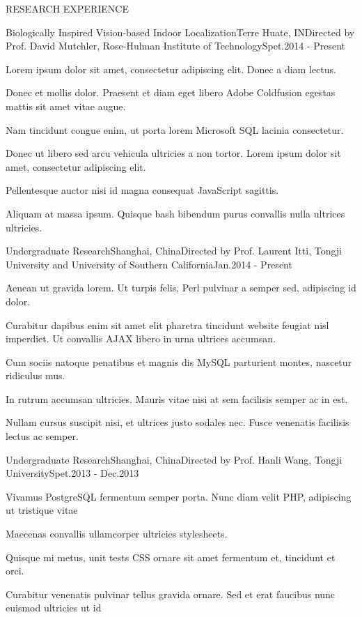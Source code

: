 \documentclass{resume} %
\begin{document}
\begin{rSection}{RESEARCH EXPERIENCE}

  \begin{rSubsection}{Biologically Inspired Vision-based Indoor Localization}{Terre Huate, IN}{Directed by Prof. David
    Mutchler, Rose-Hulman Institute of Technology}{Spet.2014 - Present}
  \item Lorem ipsum dolor sit amet, consectetur adipiscing elit. Donec a diam lectus.
  \item Donec et mollis dolor. Praesent et diam eget libero Adobe Coldfusion egestas mattis sit amet vitae augue.
  \item Nam tincidunt congue enim, ut porta lorem Microsoft SQL lacinia consectetur.
  \item Donec ut libero sed arcu vehicula ultricies a non tortor. Lorem ipsum dolor sit amet, consectetur adipiscing elit.
  \item Pellentesque auctor nisi id magna consequat JavaScript sagittis.
  \item Aliquam at massa ipsum. Quisque bash bibendum purus convallis nulla ultrices ultricies.
  \end{rSubsection}


  \begin{rSubsection}{Undergraduate Research}{Shanghai, China}{Directed by Prof. Laurent Itti, Tongji
    University and University of Southern California}{Jan.2014 - Present}
  \item Aenean ut gravida lorem. Ut turpis felis, Perl pulvinar a semper sed, adipiscing id dolor.
  \item Curabitur dapibus enim sit amet elit pharetra tincidunt website feugiat nisl imperdiet. Ut convallis AJAX libero in urna ultrices accumsan.
  \item Cum sociis natoque penatibus et magnis dis MySQL parturient montes, nascetur ridiculus mus.
  \item In rutrum accumsan ultricies. Mauris vitae nisi at sem facilisis semper ac in est.
  \item Nullam cursus suscipit nisi, et ultrices justo sodales nec. Fusce venenatis facilisis lectus ac semper.
  \end{rSubsection}


  \begin{rSubsection}{Undergraduate Research}{Shanghai, China}{Directed by Prof. Hanli Wang, Tongji
    University}{Spet.2013 - Dec.2013}
  \item Vivamus PostgreSQL fermentum semper porta. Nunc diam velit PHP, adipiscing ut tristique vitae
  \item Maecenas convallis ullamcorper ultricies stylesheets.
  \item Quisque mi metus, unit tests CSS ornare sit amet fermentum et, tincidunt et orci.
  \item Curabitur venenatis pulvinar tellus gravida ornare. Sed et erat faucibus nunc euismod ultricies ut id
  \end{rSubsection}


\end{rSection}
\end{document}
